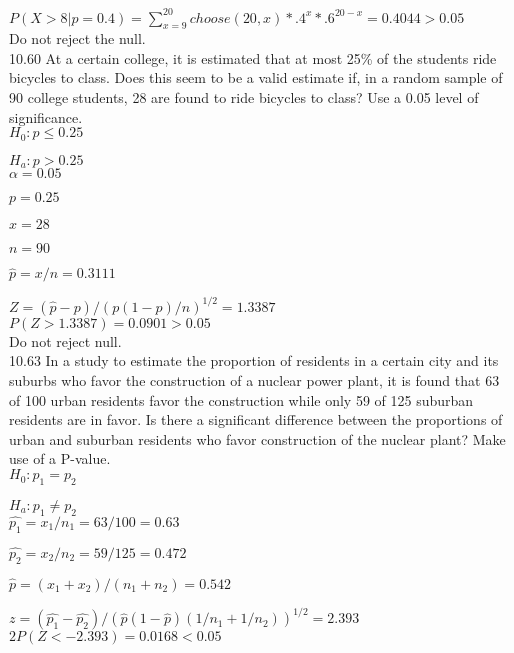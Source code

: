 $P(X > 8 | p = 0.4) = \sum^{20}_{x=9} choose(20,x)*.4^x*.6^{20-x} = 0.4044 > 0.05$ \\

Do not reject the null. \\


10.60 At a certain college, it is estimated that at most 25\% of the students ride bicycles to class. Does this seem to be a valid estimate if, in a random sample of 90 college students, 28 are found to ride bicycles to class? Use a 0.05 level of significance. \\

$H_0 : p \leq 0.25 $

$H_a : p > 0.25 $ \\

$\alpha = 0.05$

$p = 0.25$ 

$x = 28$

$n = 90$

$\hat{p} = x/n = 0.3111$ 

$Z = (\hat{p} - p)/(p(1-p)/n)^{1/2} = 1.3387$ \\

$P(Z > 1.3387) = 0.0901 > 0.05$ \\

Do not reject null. \\

10.63 In a study to estimate the proportion of residents in a certain city and its suburbs who favor the construction of a nuclear power plant, it is found that 63 of 100 urban residents favor the construction while only 59 of 125 suburban residents are in favor. Is there a significant difference between the proportions of urban and suburban residents who favor construction of the nuclear plant? Make use of a P-value. \\

$H_0 : p_1 = p_2$

$H_a : p_1 \neq p_2$ \\

$\hat{p_1} = x_1/n_1 = 63/100 = 0.63$

$\hat{p_2} = x_2/n_2 = 59/125 = 0.472$

$\hat{p} = (x_1 + x_2)/(n_1 + n_2) = $$0.542$

$z = (\hat{p_1} - \hat{p_2})/(\hat{p}(1 - \hat{p})(1/n_1 + 1/n_2))^{1/2}$$=2.393$ \\

$2P(Z < -2.393) = 0.0168 < 0.05$  \\


